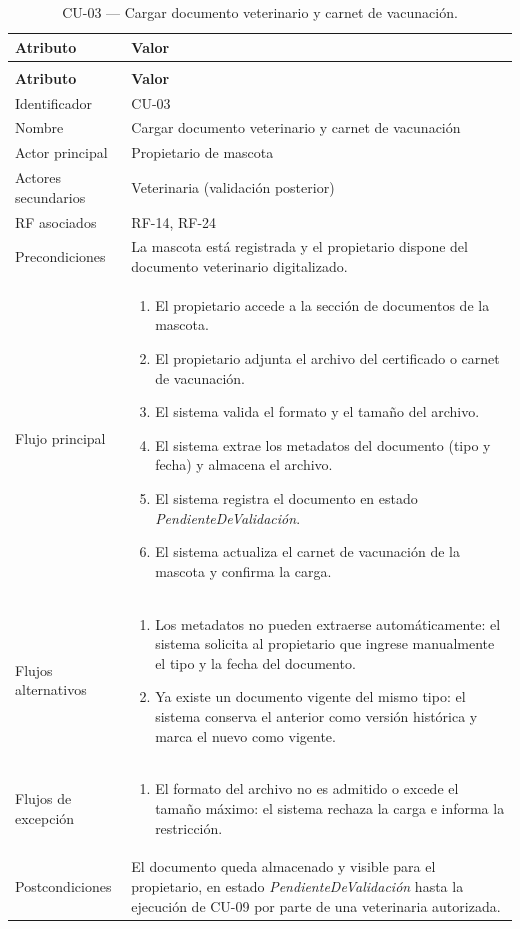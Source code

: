 \documentclass[journal,onecolumn]{IEEEtran}
\makeatletter
\newenvironment{atributos}[2]{%
	\small
	\begin{longtable}{@{}>{\raggedright\arraybackslash}p{4.2cm} >{\raggedright\arraybackslash}p{11.2cm}@{}}
		\caption{#2}\label{tab:#1}\\
		\toprule
		\textbf{Atributo} & \textbf{Valor} \\
		\midrule
		\endfirsthead
		\multicolumn{2}{@{}l}{\small\itshape (continuación)}\\
		\toprule
		\textbf{Atributo} & \textbf{Valor} \\
		\midrule
		\endhead
		\bottomrule
		\endlastfoot
	}{%
	\end{longtable}
	\normalsize
}
\makeatother
\begin{document}
	\begin{atributos}{CU-03}{CU-03 --- Cargar documento veterinario y carnet de vacunación.}
		Identificador & CU-03 \\
		Nombre & Cargar documento veterinario y carnet de vacunación \\
		Actor principal & Propietario de mascota \\
		Actores secundarios & Veterinaria (validación posterior) \\
		RF asociados & RF-14, RF-24 \\
		Precondiciones & La mascota está registrada y el propietario dispone del documento veterinario digitalizado. \\
		Flujo principal &
		\begin{enumerate}[leftmargin=*, nosep]
			\item El propietario accede a la sección de documentos de la mascota.
			\item El propietario adjunta el archivo del certificado o carnet de vacunación.
			\item El sistema valida el formato y el tamaño del archivo.
			\item El sistema extrae los metadatos del documento (tipo y fecha) y almacena el archivo.
			\item El sistema registra el documento en estado \emph{PendienteDeValidación}.
			\item El sistema actualiza el carnet de vacunación de la mascota y confirma la carga.
		\end{enumerate} \\
		Flujos alternativos &
		\begin{enumerate}[leftmargin=*, nosep]
			\item[4.1] Los metadatos no pueden extraerse automáticamente: el sistema solicita al propietario que ingrese manualmente el tipo y la fecha del documento.
			\item[6.1] Ya existe un documento vigente del mismo tipo: el sistema conserva el anterior como versión histórica y marca el nuevo como vigente.
		\end{enumerate} \\
		Flujos de excepción &
		\begin{enumerate}[leftmargin=*, nosep]
			\item[3.1] El formato del archivo no es admitido o excede el tamaño máximo: el sistema rechaza la carga e informa la restricción.
		\end{enumerate} \\
		Postcondiciones & El documento queda almacenado y visible para el propietario, en estado \emph{PendienteDeValidación} hasta la ejecución de CU-09 por parte de una veterinaria autorizada. \\
	\end{atributos}
	
\end{document}
